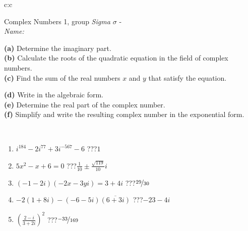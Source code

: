 \documentclass[10pt]{report}
\begin{document}
\begin{tabular}{c:c}
\\ \hdashline
\begin{minipage}[c][104.5mm][t]{0.5\linewidth}
\begin{center}
\vspace{5mm}
{\huge Complex Numbers 1, group \textit{Sigma $\sigma$} -}\\[5mm]
\textit{Name:}\phantom{xxxxxxxxxxxxxxxxxxxxxxxxxxxxxxxxxxxxxxxxxxxxxxxxxxxxxxxxxxxxxxxxx}\\[5mm]
\begin{minipage}{0.95\linewidth}
\begin{center}
{\small \begin{minipage}{0.44\textwidth} \raggedright
\textbf{(a)} Determine the imaginary part. \\[1mm]
\textbf{(b)} Calculate the roots of the quadratic equation in the field of complex numbers. \\[1mm]
\textbf{(c)} Find the sum of the real numbers \(x\) and \(y\) that satisfy the equation. \end{minipage} \begin{minipage}{0.54\textwidth}
\textbf{(d)} Write in the algebraic form. \\[1mm]
\textbf{(e)} Determine the real part of the complex number. \\[1mm]
\textbf{(f)} Simplify and write the resulting complex number in the exponential form.
\end{minipage}
} \vspace{3mm}
\end{center}
\end{minipage}
\\[1mm]
\begin{minipage}{0.79\linewidth}
\begin{center}
\begin{varwidth}{\linewidth}
\setlength{\itemsep}{0pt}
\begin{enumerate}
\large
\item $i^{184}-2i^{77}+3i^{-567}-6$\quad \dotfill\; ???\;\dotfill \quad $1$
\item $5x^2-x+6=0$\quad \dotfill\; ???\;\dotfill \quad $\frac{1}{10} \pm{}\frac{ \sqrt{119}}{10}i$
\item $(-1-2i)(-2x-3yi)=3+4i$\quad \dotfill\; ???\;\dotfill \quad $\nicefrac{29}{30}$
\item $-2(1+8i)-(-6-5i)\overline{(6+3i)}$\quad \dotfill\; ???\;\dotfill \quad $-23-4i$
\item $\left(\frac{2-i}{3+2i}\right)^2$\quad \dotfill\; ???\;\dotfill \quad $\nicefrac{-33}{169}$

\end{enumerate}
\end{varwidth}
\end{center}
\end{minipage}
\end{center}
\end{minipage}
\end{tabular}
\end{document}
